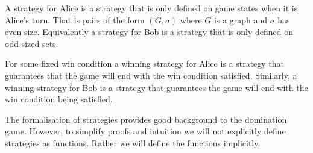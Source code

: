 A strategy for Alice is a strategy that is only defined on game states when it is Alice's turn. That is pairs of the form $(G,\sigma)$ where $G$ is a graph and $\sigma$ has even size. Equivalently a strategy for Bob is a strategy that is only defined on odd sized sets. 

For some fixed win condition a winning strategy for Alice is a strategy that guarantees that the game will  end with the win condition satisfied. Similarly, a winning strategy for Bob is a strategy that guarantees the game will end with the win condition being satisfied.

The formalisation of strategies provides good background to the domination game. However, to simplify proofs and intuition we will not explicitly define strategies as functions. Rather we will define the functions implicitly.    

    
    
    
    
    
    
    
    
    
    
    
    
    
    
    
    
    
    
    